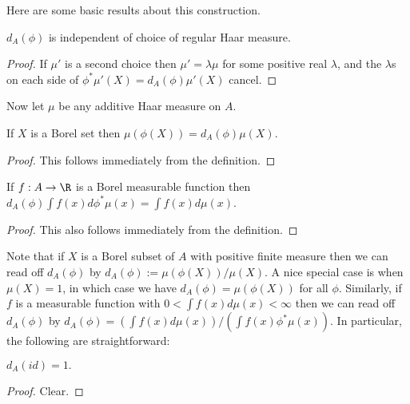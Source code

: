 Here are some basic results about this construction.

\begin{lemma}
  \label{MeasureTheory.addEquivAddHaarChar_eq}
  \leanok
  $d_A(\phi)$ is independent of choice of regular Haar measure.
\end{lemma}
\begin{proof}
  If $\mu'$ is a second choice then $\mu'=\lambda\mu$ for some
  positive real $\lambda$, and the $\lambda$s on each side of $\phi^*\mu'(X)=d_A(\phi)\mu'(X)$
  cancel.
\end{proof}

Now let $\mu$ be any additive Haar measure on $A$.

\begin{lemma}
  \label{MeasureTheory.addEquivAddHaarChar_mul_volume}
  \leanok
  If $X$ is a Borel set then $\mu(\phi(X))=d_A(\phi)\mu(X)$.
\end{lemma}
\begin{proof}
  This follows immediately from the definition.
\end{proof}

\begin{lemma}
  \label{MeasureTheory.addEquivAddHaarChar_mul_integral}
  \leanok
  If $f:A\to\R$ is a Borel measurable function then
  $d_A(\phi)\int f(x)d\phi^*\mu(x)=\int f(x)d\mu(x)$.
\end{lemma}
\begin{proof}
  This also follows immediately from the definition.
\end{proof}

Note that if $X$ is a Borel subset of $A$ with positive finite measure then we can read
off $d_A(\phi)$ by $d_A(\phi):=\mu(\phi(X))/\mu(X)$. A nice special case is when
$\mu(X)=1$, in which case we have $d_A(\phi)=\mu(\phi(X))$ for all $\phi$.
Similarly, if $f$ is a measurable function with $0<\int f(x)d\mu(x)<\infty$ then
we can read off $d_A(\phi)$ by $d_A(\phi)=(\int f(x)d\mu(x))/(\int f(x)\phi^*\mu(x))$.
In particular, the following are straightforward:

\begin{lemma}
  \label{MeasureTheory.addEquivAddHaarChar_refl}
  \leanok
  $d_A(id)=1.$
\end{lemma}
\begin{proof}
  \leanok
  Clear.
\end{proof}

